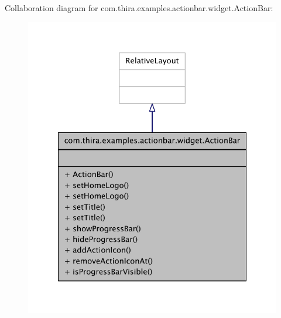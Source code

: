 Collaboration diagram for com.\-thira.\-examples.\-actionbar.\-widget.\-Action\-Bar\-:
\nopagebreak
\begin{figure}[H]
\begin{center}
\leavevmode
\includegraphics[width=324pt]{classcom_1_1thira_1_1examples_1_1actionbar_1_1widget_1_1_action_bar__coll__graph}
\end{center}
\end{figure}
